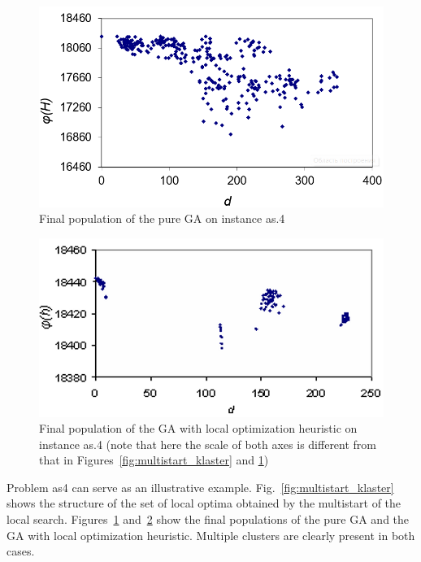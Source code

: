 \documentclass{ifacconf}
\begin{document}
 \begin{figure}[h!]
	\includegraphics[scale=0.5]{ga_klaster}
	\vspace{-1em}
  \caption{Final population of the pure GA on instance as.4} \label{fig:ga_klaster}
  \end{figure}
 \begin{figure}[h!]
\centering
 \includegraphics[scale=0.48]{gals_klaster}
 \vspace{-1em}
  \caption{Final population of the GA with local optimization heuristic on instance as.4 \label{fig:gals_klaster} 
  (note that here the scale of both axes is different from 
  that in Figures~\ref{fig:multistart_klaster} and \ref{fig:ga_klaster})}
  \end{figure}

Problem as4 can serve as an illustrative example. Fig.~\ref{fig:multistart_klaster} shows the structure 
of the set of local optima obtained by the multistart  of the local search. 
Figures~\ref{fig:ga_klaster} and~\ref{fig:gals_klaster} show the final populations of the pure GA and the GA 
with local optimization heuristic. Multiple clusters are clearly present in both cases. 
\end{document}
